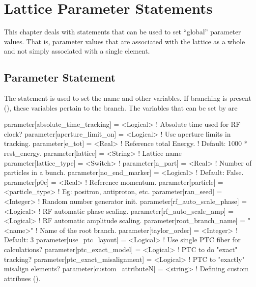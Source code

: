 \chapter{Lattice Parameter Statements}

This chapter deals with statements that can be used to set ``global''
parameter values. That is, parameter values that are associated with
the lattice as a whole and not simply associated with a single element.

\section{Parameter Statement}
\label{s:param}


The  statement is used to set the  name and
other variables. If branching is present (), these
variables pertain to the  branch. The variables that can be
set by  are
\begin{example}
  parameter[absolute_time_tracking] = <Logical>  ! Absolute time used for RF clock?
  parameter[aperture_limit_on]      = <Logical>  ! Use aperture limits in tracking.
  parameter[e_tot]         = <Real>          ! Reference total Energy. 
                                             !      Default: 1000 * rest_energy.
  parameter[lattice]       = <String>        ! Lattice name 
  parameter[lattice_type]  = <Switch>        ! 
  parameter[n_part]        = <Real>          ! Number of particles in a bunch.
  parameter[no_end_marker] = <Logical>       ! Default: False.
  parameter[p0c]           = <Real>          ! Reference momentum.
  parameter[particle]      = <particle_type> ! Eg: positron, antiproton, etc.
  parameter[ran_seed]      = <Integer>       ! Random number generator init.
  parameter[rf_auto_scale_phase]    = <Logical>  ! RF automatic phase scaling.
  parameter[rf_auto_scale_amp]      = <Logical>  ! RF automatic amplitude scaling.
  parameter[root_branch_name]       = "<name>"   ! Name of the root branch.
  parameter[taylor_order]           = <Integer>  ! Default: 3
  parameter[use_ptc_layout]         = <Logical>  ! Use single PTC fiber for calculations?
  parameter[ptc_exact_model]        = <Logical>  ! PTC to do "exact" tracking?
  parameter[ptc_exact_misalignment] = <Logical>  ! PTC to "exactly" misalign elements?
  parameter[custom_attributeN]      = <string>   ! Defining custom attribues ().
\end{example}

